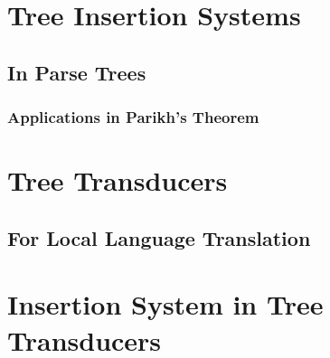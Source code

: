 \section{Tree Insertion Systems}
\subsection{In Parse Trees}
\subsubsection{Applications in Parikh's Theorem}


\section{Tree Transducers}
\subsection{For Local Language Translation}
\section{Insertion System in Tree Transducers} 

